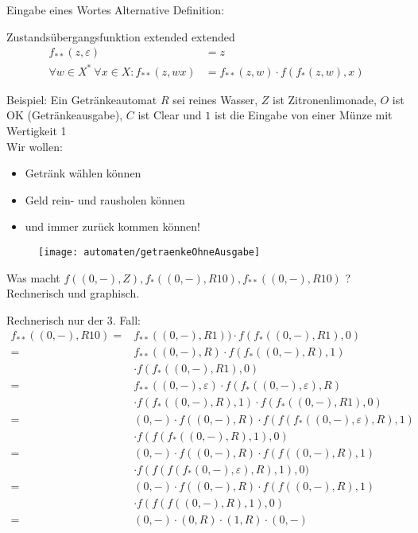 \begin{frame}{Eingabe eines Wortes}		
	Alternative Definition:
	\begin{block}{Zustandsübergangsfunktion extended extended}
		\begin{align*}
			f_{**}(z,\varepsilon) &= z \\
			\forall w \in X^* \ \forall x \in X : f_{**}(z,wx) &= f_{**}(z,w)\cdot f(f_*(z,w),x)	 
		\end{align*}
	\end{block}
\end{frame}

\begin{frame}{Beispiel: Ein Getränkeautomat}
	$R$ sei reines Wasser, $Z$ ist Zitronenlimonade, $O$ ist OK (Getränkeausgabe), $C$ ist Clear und $1$ ist die Eingabe von einer Münze mit Wertigkeit 1\\
	Wir wollen: \pause
	\begin{itemize}[<+->]
	 	\item Getränk wählen können
	 	\item Geld rein- und rausholen können
	 	\item und immer zurück kommen können!
	\end{itemize}
\end{frame}

\begin{frame}
	\begin{figure}[H]
		\texttt{[image: automaten/getraenkeOhneAusgabe]}
	\end{figure}

	Was macht $f((0,-), Z), f_*((0,-),R10) , f_{**}( (0,-),R10) $ ? Rechnerisch und graphisch.	

\end{frame}

\begin{frame}
	Rechnerisch nur der 3. Fall:
	\begin{align*}
		f_{**}((0,-),R10) =& f_{**}((0,-),R1) )\cdot f(f_*((0,-),R1),0) \\ 
		=& f_{**} ((0,-),R) \cdot f(f_*((0,-),R),1) \\ &\cdot f(f_*((0,-),R1),0) \\ 
	=& f_{**}((0,-),\varepsilon) \cdot f(f_*((0,-),\varepsilon),R) \\ &\cdot f(f_*((0,-),R),1) \cdot f(f_*((0,-),R1),0) \\ 
	=& (0,-) \cdot f((0,-),R) \cdot f( f(f_*((0,-),\varepsilon),R),1) \\ &\cdot f( f(f_*((0,-),R),1),0) \\
	=& (0,-) \cdot f((0,-),R) \cdot f( f((0,-),R),1)  \\ &\cdot f(f(  f(f_*(0,-),\varepsilon),R), 1), 0) \\
	=& (0,-) \cdot f((0,-),R) \cdot f( f((0,-),R),1)\\ &  \cdot f( f(f((0,-),R),1),0) \\ 
	= & (0,-) \cdot (0,R) \cdot (1,R) \cdot (0,-) 
	\end{align*} 
\end{frame}

